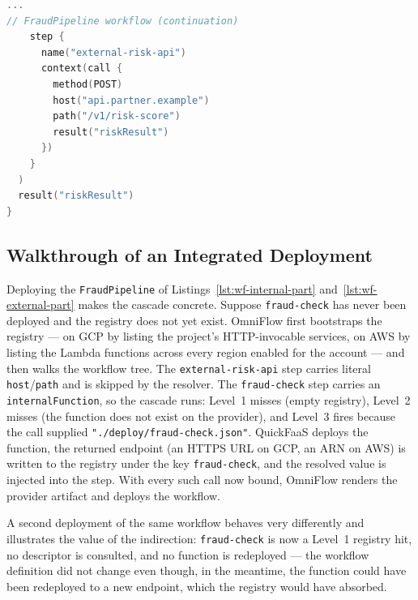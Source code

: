 \begin{lstlisting}[language=Kotlin,caption={FraudPipeline workflow (part 2/2): call with a literal endpoint.},label={lst:wf-external-part},basicstyle=\ttfamily\small,breaklines=false]
...
// FraudPipeline workflow (continuation)
    step {
      name("external-risk-api")
      context(call {
        method(POST)
        host("api.partner.example")
        path("/v1/risk-score")
        result("riskResult")
      })
    }
  )
  result("riskResult")
}
\end{lstlisting}

\subsection{Walkthrough of an Integrated Deployment}
\label{sec:walkthrough}

Deploying the \texttt{FraudPipeline} of Listings~\ref{lst:wf-internal-part}
and~\ref{lst:wf-external-part} makes the cascade concrete. Suppose \texttt{fraud-check} has never
been deployed and the registry does not yet exist. OmniFlow first bootstraps the registry --- on GCP by listing the project's HTTP-invocable
services, on AWS by listing the Lambda functions across every region enabled for the account --- and then walks the workflow tree. The \texttt{external-risk-api} step carries literal \texttt{host}/\texttt{path} and
is skipped by the resolver. The \texttt{fraud-check} step carries an \texttt{internalFunction}, so
the cascade runs: Level~1 misses (empty registry), Level~2 misses (the function does not exist on
the provider), and Level~3 fires because the call supplied
\texttt{"./deploy/fraud-check.json"}. QuickFaaS deploys the function, the returned endpoint (an
HTTPS URL on GCP, an ARN on AWS) is written to the registry under the key \texttt{fraud-check}, and
the resolved value is injected into the step. With every such call now bound, OmniFlow renders
the provider artifact and deploys the workflow.

A second deployment of the same workflow behaves very differently and illustrates the value of the
indirection: \texttt{fraud-check} is now a Level~1 registry hit, no descriptor is consulted, and no
function is redeployed --- the workflow definition did not change even though, in the meantime, the
function could have been redeployed to a new endpoint, which the registry would have absorbed.

